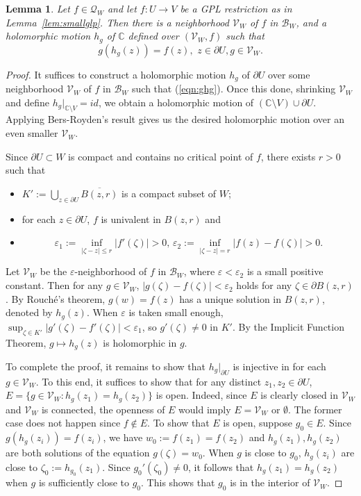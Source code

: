 \documentclass{amsart}
\numberwithin{equation}{section}
\newtheorem{lemma}[theorem]{Lemma}%
\newcommand{\C}{\mathbb C}
\theoremstyle{definition}
\theoremstyle{remark}
\begin{document}
\begin{lemma}\label{lem:persistglp} Let $f\in \mathcal{Q}_W$ and let $f:U\to V$ be a GPL restriction as in Lemma~\ref{lem:smallglp}. Then there is a neighborhood $\mathcal{V}_W$ of $f$ in $\mathcal{B}_W$,  and a holomorphic motion $h_g$ of $\C$ defined over $(\mathcal{V}_W, f)$ such that 
\begin{equation}\label{eqn:ghg}
g(h_g(z))=f(z), \,\, z\in \partial U, g\in \mathcal{V}_W.
\end{equation}
\end{lemma}
\begin{proof} It suffices to construct a holomorphic motion $h_g$ of $\partial U$ over some neighborhood $\mathcal{V}_W$ of $f$ in $\mathcal{B}_W$ such that (\ref{eqn:ghg}).  Once this done, shrinking $\mathcal{V}_W$ and define $h_g|_{\C\setminus V}=id$, we obtain a holomorphic motion of $(\C\setminus V)\cup \partial U$. Applying Bers-Royden's result gives us the desired holomorphic motion over an even smaller $\mathcal{V}_W$.

Since $\partial U\subset W$ is compact and contains no critical point of $f$, there exists $r>0$ such that 
\begin{itemize}
\item $K':=\bigcup_{z\in \partial U} \overline{B(z,r)}$ is a compact subset of $W$; 
\item for each $z\in \partial U$, $f$ is univalent in $B(z,r)$ and
\item  $$\varepsilon_1:=\inf_{|\zeta-z|\le r} |f'(\zeta)|>0, \, \varepsilon_2:=\inf_{|\zeta-z|=r} |f(z)-f(\zeta)|>0.$$ 
\end{itemize}
Let $\mathcal{V}_W$ be the $\varepsilon$-neighborhood of $f$ in $\mathcal{B}_W$, where $\varepsilon<\varepsilon_2$ is a small positive constant. Then for any $g\in \mathcal{V}_W$, $|g(\zeta)-f(\zeta)|<\varepsilon_2$ holds for any $\zeta\in \partial B(z, r)$. 
By Rouch\'e's theorem, $g(w)=f(z)$ has a unique solution in $B(z,r)$, denoted by $h_g(z)$. When $\varepsilon$ is taken small enough, $\sup_{\zeta\in K'}|g'(\zeta)-f'(\zeta)|<\varepsilon_1$, so $g'(\zeta)\not=0$ in $K'$. By the Implicit Function Theorem, $g\mapsto h_g(z)$ is holomorphic in $g$. 

To complete the proof, it remains to show that $h_g|_{\partial U}$ is injective in for each $g\in \mathcal{V}_W$. To this end, it suffices to show that for any distinct $z_1,z_2\in \partial U$, $E=\{g\in \mathcal{V}_W: h_g(z_1)=h_g(z_2)\}$ is open. Indeed, since $E$ is clearly closed in $\mathcal{V}_W$ and $\mathcal{V}_W$ is connected, the openness of $E$ would imply $E=\mathcal{V}_W$ or $\emptyset$. The former case does not happen since $f\not\in E$. To show that $E$ is open, suppose $g_0\in E$. Since $g(h_{g}(z_i))=f(z_i)$, we have $w_0:=f(z_1)=f(z_2)$ and $h_g(z_1), h_g(z_2)$ are both solutions of the equation $g(\zeta)=w_0$. When $g$ is close to $g_0$, $h_g(z_i)$ are close to $\zeta_0:=h_{g_0}(z_1)$. Since $g_0'(\zeta_0)\not=0$, it follows that $h_g(z_1)=h_g(z_2)$ when $g$ is sufficiently close to $g_0$. This shows that $g_0$ is in the interior of $\mathcal{V}_W$. 
\end{proof}
\end{document}
